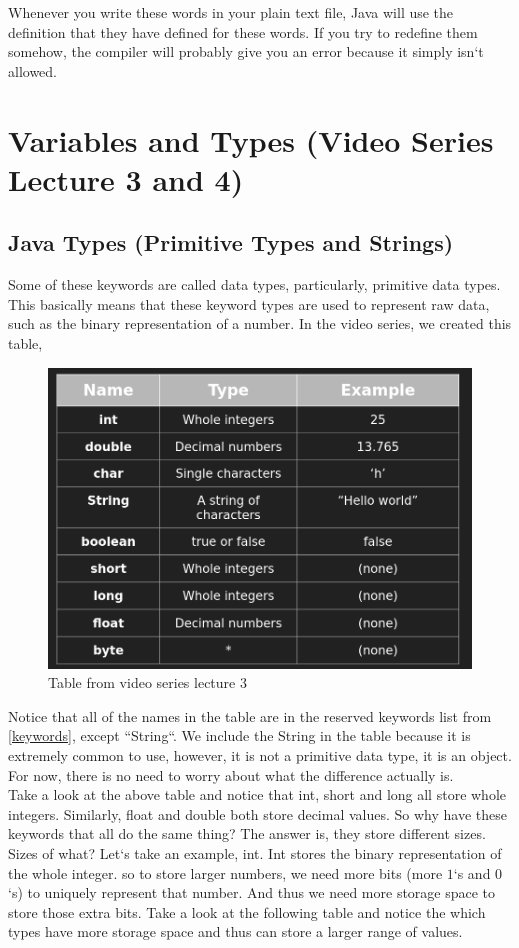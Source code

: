 \documentclass[11]{article}
\begin{document}
Whenever you write these words in your plain text file, Java will use the definition that they have defined for these words. If you try to redefine them somehow, the compiler will probably give you an error because it simply isn`t allowed.\\


\section{Variables and Types (Video Series Lecture 3 and 4)}
\subsection{Java Types (Primitive Types and Strings)}
Some of these keywords are called data types, particularly, primitive data types. This basically means that these keyword types are used to represent raw data, such as the binary representation of a number. In the video series, we created this table, 
\begin{figure}[H]
	\centering
	\includegraphics[scale=0.5]{primitives.png}
	\caption{Table from video series lecture 3}
\end{figure}

Notice that all of the names in the table are in the reserved keywords list from \ref{keywords}, except ``String``. We include the String in the table because it is extremely common to use, however, it is not a primitive data type, it is an object. For now, there is no need to worry about what the difference actually is.\\

Take a look at the above table and notice that  int, short and long all store whole integers. Similarly, float and double both store decimal values. So why have these keywords that all do the same thing? The answer is, they store different sizes. Sizes of what? Let`s take an example, int. Int stores the binary representation of the whole integer. so to store larger numbers, we need more bits (more $1$`s and $0$`s) to uniquely represent that number. And thus we need more storage space to store those extra bits. Take a look at the following table and notice the which types have more storage space and thus can store a larger range of values.
\end{document}
